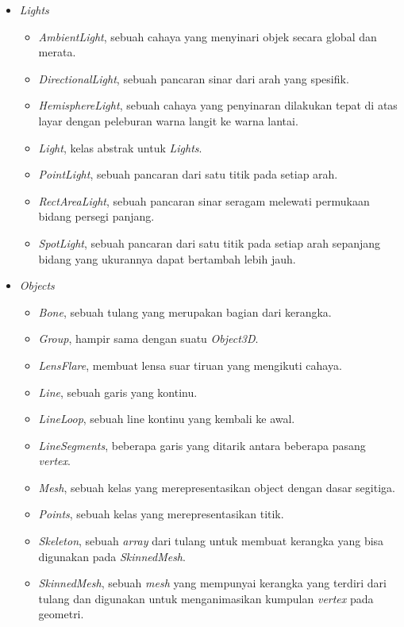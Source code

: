 \begin{itemize}
\item \textit{Lights}

	\begin{itemize}
	\item {\it AmbientLight}, sebuah cahaya yang menyinari objek secara global dan merata.
	\item {\it DirectionalLight}, sebuah pancaran sinar dari arah yang spesifik.
	\item {\it HemisphereLight}, sebuah cahaya yang penyinaran dilakukan tepat di atas layar dengan peleburan warna langit ke warna lantai.
	\item {\it Light}, kelas abstrak untuk {\it Lights}.
	\item {\it PointLight}, sebuah pancaran dari satu titik pada setiap arah.
	\item {\it RectAreaLight}, sebuah pancaran sinar seragam melewati permukaan bidang persegi panjang.
	\item {\it SpotLight}, sebuah pancaran dari satu titik pada setiap arah sepanjang bidang yang ukurannya dapat bertambah lebih jauh.
	\end{itemize}
	
\item \textit{Objects}

	\begin{itemize}
	\item {\it Bone}, sebuah tulang yang merupakan bagian dari kerangka.
	\item {\it Group}, hampir sama dengan suatu {\it Object3D}.
	\item {\it LensFlare}, membuat lensa suar tiruan yang mengikuti cahaya.
	\item {\it Line}, sebuah garis yang kontinu.
	\item {\it LineLoop}, sebuah line kontinu yang kembali ke awal.
	\item {\it LineSegments}, beberapa garis yang ditarik antara beberapa pasang {\it vertex}.
	\item {\it Mesh}, sebuah kelas yang merepresentasikan object dengan dasar segitiga.
	\item {\it Points}, sebuah kelas yang merepresentasikan titik.
	\item {\it Skeleton}, sebuah {\it array} dari tulang untuk membuat kerangka yang bisa digunakan pada {\it SkinnedMesh}.
	\item {\it SkinnedMesh}, sebuah {\it mesh} yang mempunyai kerangka yang terdiri dari tulang dan digunakan untuk menganimasikan kumpulan {\it vertex} pada geometri.
	\end{itemize}
	

\end{itemize}
